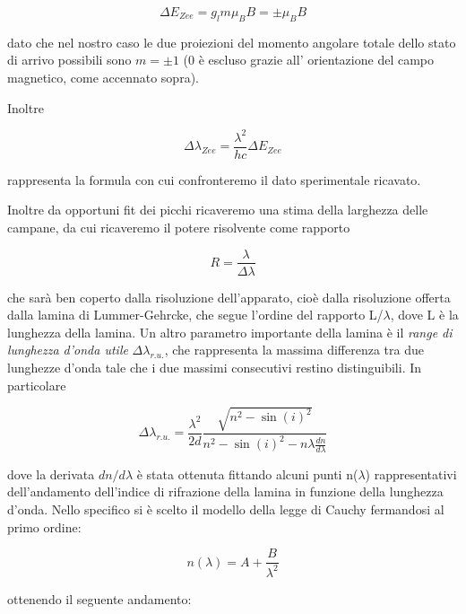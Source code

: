 \documentclass{article}
\begin{document}
	\begin{equation}
		\Delta E_{Zee} = g_l m \mu_B B = \pm \mu_B B
	\end{equation}
	
	
	dato che nel nostro caso le due proiezioni del momento angolare totale
	dello stato di arrivo possibili sono $m = \pm 1$ (0 è escluso grazie all'
	orientazione del campo magnetico, come accennato sopra).
	
	Inoltre
	
	\begin{equation}
		\Delta\lambda_{Zee} = \frac{\lambda^2}{hc}\Delta E_{Zee}
	\end{equation}
	
	rappresenta la formula con cui confronteremo il dato sperimentale
	ricavato.
	
	Inoltre da opportuni fit dei picchi ricaveremo una stima della larghezza
	delle campane, da cui ricaveremo il potere risolvente come rapporto
	
	\begin{equation}
		R = \frac{\lambda}{\Delta\lambda}    
	\end{equation}
	
	che sarà ben coperto dalla risoluzione dell'apparato, cioè dalla
	risoluzione offerta dalla lamina di Lummer-Gehrcke, che segue l'ordine
	del rapporto L/$\lambda$, dove L è la lunghezza della lamina.
	Un altro parametro importante della lamina è il \textit{range di 
		lunghezza d'onda utile} $\Delta\lambda_{r.u.}$, che rappresenta la
	massima differenza tra due lunghezze d'onda tale che i due massimi 
	consecutivi restino distinguibili. In particolare
	
	\begin{equation}
		\label{eqn:dlru}
		\Delta\lambda_{r.u.} = \frac{\lambda^2}{2d}\frac{\sqrt{n^2-\sin(i)^2}}{n^2-\sin(i)^2-n\lambda\frac{dn}{d\lambda}}
	\end{equation}
	
	dove la derivata $dn/d\lambda$ è stata ottenuta fittando alcuni punti 
	n($\lambda$) rappresentativi dell'andamento dell'indice di rifrazione
	della lamina in funzione della lunghezza d'onda. Nello specifico si è
	scelto il modello della legge di Cauchy fermandosi al primo ordine:

	\begin{equation}
		n(\lambda) = A + \frac{B}{\lambda^2}    
	\end{equation}


	ottenendo il seguente andamento:
	
\end{document}
